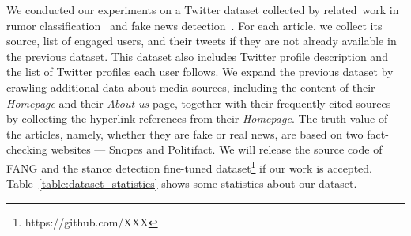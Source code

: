 \documentclass[sigconf,anonymous]{acmart}
\theoremstyle{definition}
\theoremstyle{hypothesis}
\begin{document}
We conducted our experiments on a Twitter dataset collected by related~work in rumor classification~\cite{ma2016detecting} and fake news detection~\cite{shu2018fakenewsnet}. For each article, we collect its source, list of engaged users, and their tweets if they are not already available in the previous dataset.
This dataset also
includes Twitter profile description and the list of Twitter profiles each user follows. We expand the previous dataset by crawling additional data about media sources, including the content of their \emph{Homepage} and their \emph{About us} page, together with their frequently cited sources by collecting the hyperlink references from their \emph{Homepage}. The truth value of the articles, namely, whether they are fake or real news, are based on two fact-checking websites --- Snopes and Politifact. 
We will release the source code of FANG and the stance detection fine-tuned dataset\footnote{https://github.com/XXX} if our work is accepted.
Table~\ref{table:dataset_statistics} shows some statistics about our dataset. 
\end{document}
